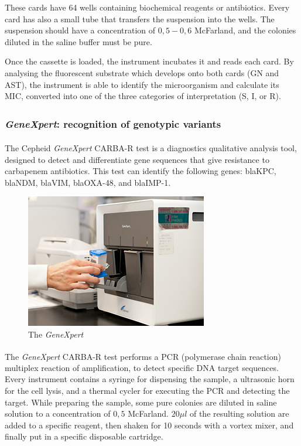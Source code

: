 \documentclass[11pt]{report}
\begin{document}
These cards have 64 wells containing biochemical reagents or antibiotics. Every card has also a small tube that transfers the suspension into the wells.
The suspension should have a concentration of $0,5-0,6$ McFarland, and the colonies diluted in the saline buffer must be pure.

Once the cassette is loaded, the instrument incubates it and reads each card.
By analysing the fluorescent substrate which develops onto both cards (GN and AST), the instrument is able to identify the microorganism and calculate its MIC, converted into one of the three categories of interpretation (S, I, or R).

\subsubsection{\emph{GeneXpert}\textsuperscript{\textregistered}: recognition of genotypic variants}
The Cepheid \emph{GeneXpert}\textsuperscript{\textregistered} CARBA-R test is a diagnostics qualitative analysis tool, designed to detect and differentiate gene sequences that give resistance to carbapenem antibiotics.
This test can identify the following genes: blaKPC, blaNDM, blaVIM, blaOXA-48, and blaIMP-1.

\begin{figure}[htp]
\centering
\includegraphics[scale=1.00]{img/genexpert.jpg}
\caption{The \emph{GeneXpert}}
\label{}
\end{figure}

The \emph{GeneXpert}\textsuperscript{\textregistered} CARBA-R test performs a PCR (polymerase chain reaction) multiplex reaction of amplification, to detect specific DNA target sequences.
Every instrument contains a syringe for dispensing the sample, a ultrasonic horn for the cell lysis, and a thermal cycler for executing the PCR and detecting the target.
While preparing the sample, some pure colonies are diluted in saline solution to a concentration of $0,5$ McFarland. 
$20\mu l$ of the resulting solution are added to a specific reagent, then shaken for 10 seconds with a vortex mixer, and finally put in a specific disposable cartridge.
\end{document}
